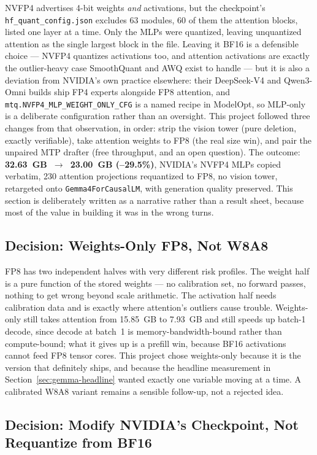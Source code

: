 \documentclass[11pt]{article}
\begin{document}
NVFP4 advertises 4-bit weights \emph{and} activations, but the checkpoint's
\texttt{hf\_quant\_config.json} excludes 63 modules, 60 of them the attention blocks,
listed one layer at a time. Only the MLPs were quantized, leaving unquantized attention
as the single largest block in the file. Leaving it BF16 is a defensible choice ---
NVFP4 quantizes activations too, and attention activations are exactly the
outlier-heavy case SmoothQuant and AWQ exist to handle --- but it is also a deviation
from NVIDIA's own practice elsewhere: their DeepSeek-V4 and Qwen3-Omni builds ship FP4
experts alongside FP8 attention, and \texttt{mtq.NVFP4\_MLP\_WEIGHT\_ONLY\_CFG} is a
named recipe in ModelOpt, so MLP-only is a deliberate configuration rather than an
oversight. This project followed three changes from that observation, in order: strip
the vision tower (pure deletion, exactly verifiable), take attention weights to FP8 (the
real size win), and pair the unpaired MTP drafter (free throughput, and an open
question). The outcome: \textbf{32.63~GB~$\to$~23.00~GB (--29.5\%)}, NVIDIA's NVFP4 MLPs
copied verbatim, 230 attention projections requantized to FP8, no vision tower,
retargeted onto \texttt{Gemma4ForCausalLM}, with generation quality preserved. This
section is deliberately written as a narrative rather than a result sheet, because most
of the value in building it was in the wrong turns.

\subsection{Decision: Weights-Only FP8, Not W8A8}

FP8 has two independent halves with very different risk profiles. The weight half is a
pure function of the stored weights --- no calibration set, no forward passes, nothing to
get wrong beyond scale arithmetic. The activation half needs calibration data and is
exactly where attention's outliers cause trouble. Weights-only still takes attention
from 15.85~GB to 7.93~GB and still speeds up batch-1 decode, since decode at batch~1 is
memory-bandwidth-bound rather than compute-bound; what it gives up is a prefill win,
because BF16 activations cannot feed FP8 tensor cores. This project chose weights-only
because it is the version that definitely ships, and because the headline measurement in
Section~\ref{sec:gemma-headline} wanted exactly one variable moving at a time. A
calibrated W8A8 variant remains a sensible follow-up, not a rejected idea.

\subsection{Decision: Modify NVIDIA's Checkpoint, Not Requantize from BF16}
\end{document}
